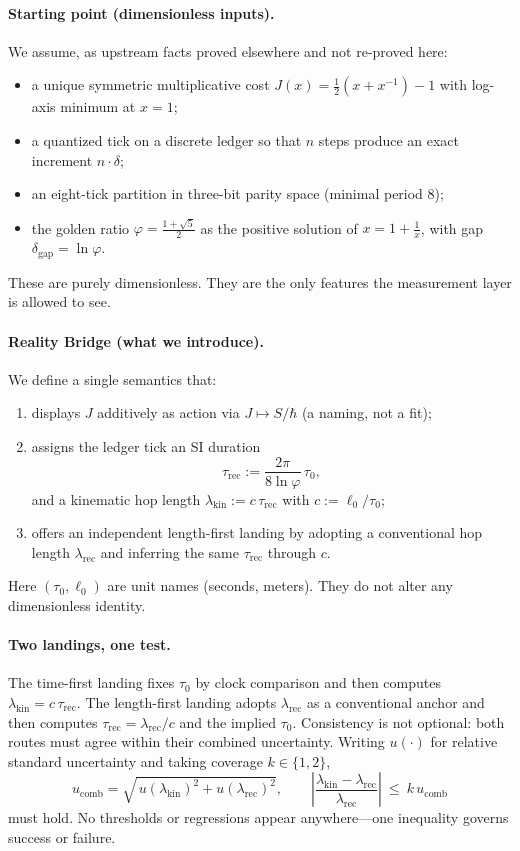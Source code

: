 \documentclass[11pt]{article}
\begin{document}
\paragraph{Starting point (dimensionless inputs).}
We assume, as upstream facts proved elsewhere and not re-proved here:
\begin{itemize}
  \item a unique symmetric multiplicative cost \(J(x)=\tfrac12(x+x^{-1})-1\) with log-axis minimum at \(x=1\);
  \item a quantized tick on a discrete ledger so that \(n\) steps produce an exact increment \(n\cdot\delta\);
  \item an eight-tick partition in three-bit parity space (minimal period \(8\));
  \item the golden ratio \(\varphi=\frac{1+\sqrt{5}}{2}\) as the positive solution of \(x=1+\frac1x\), with gap \(\delta_{\mathrm{gap}}=\ln\varphi\).
\end{itemize}
These are purely dimensionless. They are the only features the measurement layer is allowed to see.

\paragraph{Reality Bridge (what we introduce).}
We define a single semantics that:
\begin{enumerate}
  \item displays \(J\) additively as action via \(J\mapsto S/\hbar\) (a naming, not a fit);
  \item assigns the ledger tick an SI duration
  \[
  \tau_{\mathrm{rec}}:=\frac{2\pi}{8\ln\varphi}\,\tau_{0},
  \]
  and a kinematic hop length \(\lambda_{\mathrm{kin}}:=c\,\tau_{\mathrm{rec}}\) with \(c:=\ell_{0}/\tau_{0}\);
  \item offers an independent length-first landing by adopting a conventional hop length \(\lambda_{\mathrm{rec}}\) and inferring the same \(\tau_{\mathrm{rec}}\) through \(c\).
\end{enumerate}
Here \((\tau_{0},\ell_{0})\) are unit names (seconds, meters). They do not alter any dimensionless identity.

\paragraph{Two landings, one test.}
The time-first landing fixes \(\tau_{0}\) by clock comparison and then computes \(\lambda_{\mathrm{kin}}=c\,\tau_{\mathrm{rec}}\).
The length-first landing adopts \(\lambda_{\mathrm{rec}}\) as a conventional anchor and then computes \(\tau_{\mathrm{rec}}=\lambda_{\mathrm{rec}}/c\) and the implied \(\tau_{0}\).
Consistency is not optional: both routes must agree within their combined uncertainty. Writing \(u(\cdot)\) for relative standard uncertainty and taking coverage \(k\in\{1,2\}\),
\[
u_{\mathrm{comb}}=\sqrt{\,u(\lambda_{\mathrm{kin}})^{2}+u(\lambda_{\mathrm{rec}})^{2}},\qquad
\left|\frac{\lambda_{\mathrm{kin}}-\lambda_{\mathrm{rec}}}{\lambda_{\mathrm{rec}}}\right|\ \le\ k\,u_{\mathrm{comb}}
\]
must hold. No thresholds or regressions appear anywhere—one inequality governs success or failure.
\end{document}
